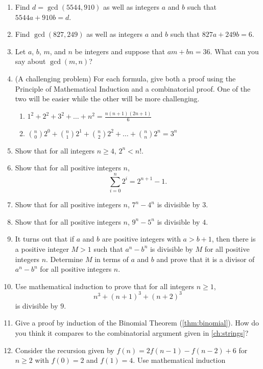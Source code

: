 \begin{enumerate}
\item Find $d=\gcd(5544,910)$ as well as integers $a$ and $b$ such
  that $5544a + 910 b = d$.
\item Find $\gcd(827,249)$ as well as integers $a$ and $b$ such that
  $827a+249b = 6$.
\item Let $a$, $b$, $m$, and $n$ be integers and suppose that
  $am+bn=36$. What can you say about $\gcd(m,n)$?
\item  (A challenging problem)  For
  each formula, give both a proof using the Principle of
  Mathematical Induction and a combinatorial proof. One of the two
  will be easier while the other will be more challenging.
  \begin{enumerate}
  \item $\displaystyle 1^2+2^2+3^2+\dots+ n^2= \frac{n(n+1)(2n+1)}{6}$
  \item $\displaystyle\binom{n}{0}2^0+\binom{n}{1}2^1+\binom{n}{2}2^2+\dots+\binom{n}{n}2^n=3^n$
  \end{enumerate}
\item Show that for all integers $n\geq 4$, $2^n < n!$.
\item Show that for all positive integers $n$,
  \[\sum_{i=0}^n 2^i = 2^{n+1}-1.\]
\item Show that for all positive integers $n$, $7^n-4^n$ is divisible
  by $3$.
\item Show that for all positive integers $n$, $9^n-5^n$ is divisible
  by $4$.
\item It turns out that if $a$ and $b$ are positive integers with
  $a>b+1$, then there is a positive integer $M>1$ such that $a^n-b^n$
  is divisible by $M$ for all positive integers $n$. Determine $M$ in
  terms of $a$ and $b$ and prove that it is a divisor of $a^n-b^n$ for
  all positive integers $n$.
\item Use mathematical induction to prove that for all integers $n\geq
  1$,
  \[n^3 + (n+1)^3 + (n+2)^3\]
  is divisible by $9$.
\item Give a proof by induction of the Binomial Theorem
  (\autoref{thm:binomial}). How do you think it compares to the
  combinatorial argument given in \autoref{ch:strings}?
\item Consider the recursion given by $f(n) = 2f(n-1) - f(n-2) + 6$
  for $n\geq 2$ with $f(0)=2$ and $f(1)=4$. Use mathematical induction

\end{enumerate}
